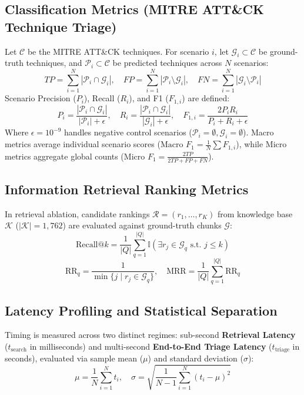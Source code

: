 \subsection{Classification Metrics (MITRE ATT\&CK Technique Triage)}
Let $\mathcal{C}$ be the MITRE ATT\&CK techniques. For scenario $i$, let $\mathcal{G}_i \subset \mathcal{C}$ be ground-truth techniques, and $\mathcal{P}_i \subset \mathcal{C}$ be predicted techniques across $N$ scenarios:
\begin{equation}
TP = \sum_{i=1}^N |\mathcal{P}_i \cap \mathcal{G}_i|, \quad FP = \sum_{i=1}^N |\mathcal{P}_i \setminus \mathcal{G}_i|, \quad FN = \sum_{i=1}^N |\mathcal{G}_i \setminus \mathcal{P}_i|
\end{equation}
Scenario Precision ($P_i$), Recall ($R_i$), and F1 ($F_{1,i}$) are defined:
\begin{equation}
\label{eq:prec_rec_f1}
P_i = \frac{|\mathcal{P}_i \cap \mathcal{G}_i|}{|\mathcal{P}_i| + \epsilon}, \quad R_i = \frac{|\mathcal{P}_i \cap \mathcal{G}_i|}{|\mathcal{G}_i| + \epsilon}, \quad F_{1,i} = \frac{2 P_i R_i}{P_i + R_i + \epsilon}
\end{equation}
Where $\epsilon = 10^{-9}$ handles negative control scenarios ($\mathcal{P}_i = \emptyset, \mathcal{G}_i = \emptyset$). Macro metrics average individual scenario scores ($\text{Macro } F_1 = \frac{1}{N} \sum F_{1,i}$), while Micro metrics aggregate global counts ($\text{Micro } F_1 = \frac{2 TP}{2 TP + FP + FN}$).

\subsection{Information Retrieval Ranking Metrics}
In retrieval ablation, candidate rankings $\mathcal{R} = (r_1, \dots, r_K)$ from knowledge base $\mathcal{K}$ ($|\mathcal{K}| = 1,762$) are evaluated against ground-truth chunks $\mathcal{G}$:
\begin{equation}
\label{eq:recall_at_k}
\text{Recall}@k = \frac{1}{|Q|} \sum_{q=1}^{|Q|} \mathbb{I}\left( \exists r_j \in \mathcal{G}_q \text{ s.t. } j \le k \right)
\end{equation}
\begin{equation}
\label{eq:mrr}
\text{RR}_q = \frac{1}{\min \{j \mid r_j \in \mathcal{G}_q\}}, \quad \text{MRR} = \frac{1}{|Q|} \sum_{q=1}^{|Q|} \text{RR}_q
\end{equation}

\subsection{Latency Profiling and Statistical Separation}
Timing is measured across two distinct regimes: sub-second \textbf{Retrieval Latency} ($t_{\text{search}}$ in milliseconds) and multi-second \textbf{End-to-End Triage Latency} ($t_{\text{triage}}$ in seconds), evaluated via sample mean ($\mu$) and standard deviation ($\sigma$):
\begin{equation}
\label{eq:latency_stats}
\mu = \frac{1}{N} \sum_{i=1}^N t_i, \quad \sigma = \sqrt{\frac{1}{N-1} \sum_{i=1}^N (t_i - \mu)^2}
\end{equation}